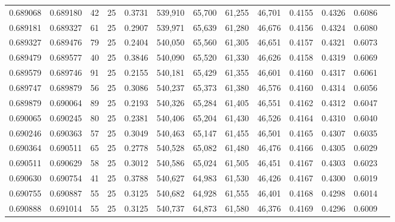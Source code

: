 \begin{tabular}{rrrrrrrrrrrrr}
0.689068 & 0.689180 &    42 &  25 &                                     0.3731 & 539,910 &  65,700 &  61,255 &  46,701 & 0.4155 & 0.4326 & 0.6086 \\
0.689181 & 0.689327 &    61 &  25 &                                     0.2907 & 539,971 &  65,639 &  61,280 &  46,676 & 0.4156 & 0.4324 & 0.6080 \\
0.689327 & 0.689476 &    79 &  25 &                                     0.2404 & 540,050 &  65,560 &  61,305 &  46,651 & 0.4157 & 0.4321 & 0.6073 \\
0.689479 & 0.689577 &    40 &  25 &                                     0.3846 & 540,090 &  65,520 &  61,330 &  46,626 & 0.4158 & 0.4319 & 0.6069 \\
0.689579 & 0.689746 &    91 &  25 &                                     0.2155 & 540,181 &  65,429 &  61,355 &  46,601 & 0.4160 & 0.4317 & 0.6061 \\
0.689747 & 0.689879 &    56 &  25 &                                     0.3086 & 540,237 &  65,373 &  61,380 &  46,576 & 0.4160 & 0.4314 & 0.6056 \\
0.689879 & 0.690064 &    89 &  25 &                                     0.2193 & 540,326 &  65,284 &  61,405 &  46,551 & 0.4162 & 0.4312 & 0.6047 \\
0.690065 & 0.690245 &    80 &  25 &                                     0.2381 & 540,406 &  65,204 &  61,430 &  46,526 & 0.4164 & 0.4310 & 0.6040 \\
0.690246 & 0.690363 &    57 &  25 &                                     0.3049 & 540,463 &  65,147 &  61,455 &  46,501 & 0.4165 & 0.4307 & 0.6035 \\
0.690364 & 0.690511 &    65 &  25 &                                     0.2778 & 540,528 &  65,082 &  61,480 &  46,476 & 0.4166 & 0.4305 & 0.6029 \\
0.690511 & 0.690629 &    58 &  25 &                                     0.3012 & 540,586 &  65,024 &  61,505 &  46,451 & 0.4167 & 0.4303 & 0.6023 \\
0.690630 & 0.690754 &    41 &  25 &                                     0.3788 & 540,627 &  64,983 &  61,530 &  46,426 & 0.4167 & 0.4300 & 0.6019 \\
0.690755 & 0.690887 &    55 &  25 &                                     0.3125 & 540,682 &  64,928 &  61,555 &  46,401 & 0.4168 & 0.4298 & 0.6014 \\
0.690888 & 0.691014 &    55 &  25 &                                     0.3125 & 540,737 &  64,873 &  61,580 &  46,376 & 0.4169 & 0.4296 & 0.6009 \\

\end{tabular}
